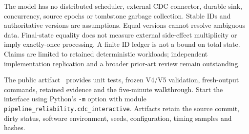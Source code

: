 \documentclass[sigconf,9pt]{acmart}
\begin{document}
The model has no distributed scheduler, external CDC connector, durable sink,
concurrency, source epochs or tombstone garbage collection. Stable IDs and authoritative
versions are assumptions. Equal versions cannot resolve ambiguous data. Final-state
equality does not measure external side-effect multiplicity or imply exactly-once
processing. A finite ID ledger is not a bound on total state. Claims are limited to
retained deterministic workloads; independent implementation replication and a
broader prior-art review remain outstanding.

The public artifact~\cite{artifact} provides unit tests, frozen V4/V5 validation,
fresh-output commands, retained evidence and the five-minute walkthrough. Start the
interface using Python's \texttt{-m} option with module
\texttt{pipeline\_reliability.}\allowbreak\texttt{cdc\_interactive}.
Artifacts retain the source commit, dirty status, software environment, seeds,
configuration, timing samples and hashes.


\end{document}

